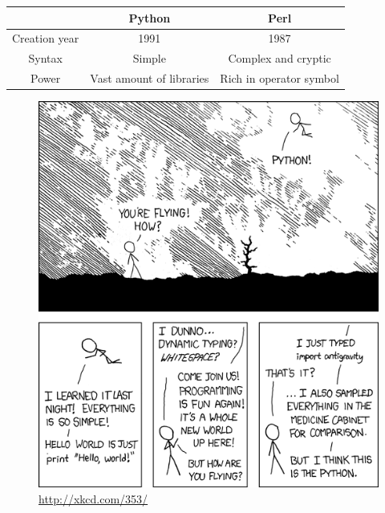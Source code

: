 \documentclass[article,10pt]{scrartcl}
\begin{document}
\begin{center}
\begin{tabular}{|c|cc|}
\hline
& Python & Perl\\
\hline
Creation year & 1991 & 1987\\
Syntax & Simple & Complex and cryptic\\
Power & Vast amount of libraries & Rich in operator symbol \\
\hline
\end{tabular}
\end{center}

\begin{figure}[h!]
\begin{center}
\includegraphics[scale=0.3]{xkcd_python.png}\\
\url{http://xkcd.com/353/}
\end{center}
\end{figure}
\end{document}
